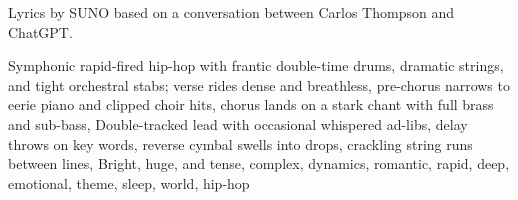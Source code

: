
\begin{notes}
Lyrics by SUNO based on a conversation between Carlos Thompson and ChatGPT.
\end{notes}
\begin{style}
Symphonic rapid-fired hip-hop with frantic double-time drums, dramatic strings, and tight orchestral stabs; verse rides dense and breathless, pre-chorus narrows to eerie piano and clipped choir hits, chorus lands on a stark chant with full brass and sub-bass, Double-tracked lead with occasional whispered ad-libs, delay throws on key words, reverse cymbal swells into drops, crackling string runs between lines, Bright, huge, and tense, complex, dynamics, romantic, rapid, deep, emotional, theme, sleep, world, hip-hop
\end{style}
